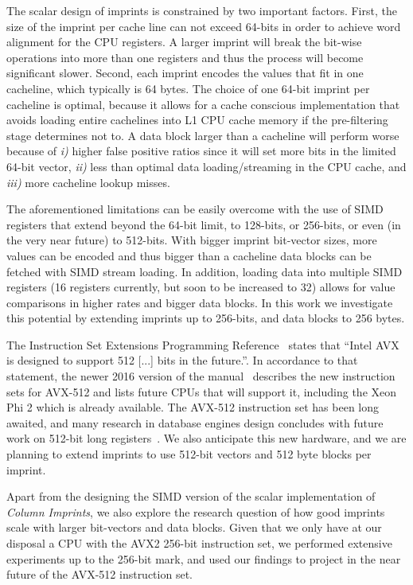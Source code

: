 \documentclass[sigconf]{acmart}
\begin{document}
The scalar design of imprints is constrained by two important factors. First, the size of
the imprint per cache line can not exceed 64-bits in order to achieve word alignment for
the CPU registers. A larger imprint will break the bit-wise operations into more than one
registers and thus the process will become significant slower. Second, each imprint encodes
the values that fit in one cacheline, which typically is 64 bytes. The choice of one 64-bit
imprint per cacheline is optimal, because it allows for a cache conscious implementation that
avoids loading entire cachelines into L1 CPU cache memory if the pre-filtering stage determines
not to. A data block larger than a cacheline will perform worse because of {\em i)} higher false
positive ratios since it will set more bits in the limited 64-bit vector, {\em ii)} less than
optimal data loading/streaming in the CPU cache, and {\em iii)} more cacheline lookup misses.

The aforementioned limitations can be easily overcome with the use of SIMD 
registers that extend beyond the 64-bit limit, to 128-bits, or 256-bits, or even
(in the very near future) to 512-bits. With bigger imprint bit-vector sizes, more values
can be encoded and thus  bigger than a cacheline data blocks can be fetched with SIMD stream
loading. In addition, loading data into multiple SIMD registers (16 registers currently, but
soon to be increased to 32)  allows for value comparisons in higher rates and bigger data blocks.
In this work we investigate this potential by extending imprints up to 256-bits, and data blocks
to 256 bytes.  

The Instruction Set Extensions Programming Reference~\cite{IntelManual2011} states that 
``Intel AVX is designed to support 512 [...] bits in the future.''. In accordance to that
statement, the newer 2016 version of the manual~\cite{IntelManual2016} describes 
the new instruction sets for AVX-512 and lists future CPUs that will support 
it, including the Xeon Phi 2 which is already available. The AVX-512 instruction set has been long 
awaited, and many research in database engines design concludes with 
future work on 512-bit long registers~\cite{DBLP:journals/pvldb/KimSCKNBLSD09}. We 
also anticipate this new hardware, and we are planning to extend imprints to use 
512-bit vectors and 512 byte blocks per imprint.

Apart from the designing the SIMD version of the  scalar implementation of
{\em Column Imprints}, we also explore the research question of how good imprints
scale with larger bit-vectors and data blocks. Given that we only  have at our
disposal a CPU with the AVX2 256-bit instruction set, we performed extensive 
experiments up to the 256-bit mark, and used our findings to project in the 
near future of the AVX-512 instruction set.
\end{document}
